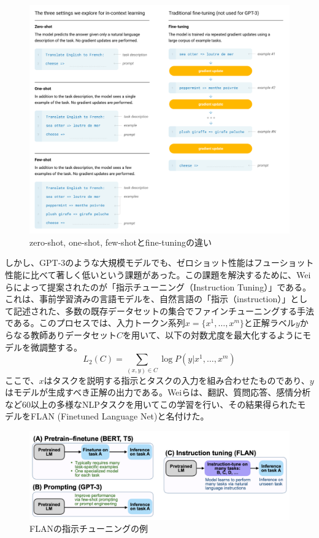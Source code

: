 \documentclass[a4paper,11pt]{jreport}
\begin{document}
\begin{figure}[t]
  \centering
  \includegraphics[width=\linewidth]{./fig/gpt3_fig2.png}
  \caption{zero-shot, one-shot, few-shotとfine-tuningの違い\cite{GPT-3}}
  \label{fig:gpt3_example}
\end{figure}

しかし、GPT-3のような大規模モデルでも、ゼロショット性能はフューショット性能に比べて著しく低いという課題があった。この課題を解決するために、Weiらによって提案されたのが「指示チューニング（Instruction Tuning）」である\cite{Instruction-Tuning}。これは、事前学習済みの言語モデルを、自然言語の「指示（instruction）」として記述された、多数の既存データセットの集合でファインチューニングする手法である。このプロセスでは、入力トークン系列$x = \{x^1, \dots, x^m\}$と正解ラベル$y$からなる教師ありデータセット$C$を用いて、以下の対数尤度を最大化するようにモデルを微調整する。
$$
L_2(C) = \sum_{(x,y) \in C} \log P(y | x^1, \dots, x^m)
$$
ここで、$x$はタスクを説明する指示とタスクの入力を組み合わせたものであり、$y$はモデルが生成すべき正解の出力である。Weiらは、翻訳、質問応答、感情分析など60以上の多様なNLPタスクを用いてこの学習を行い、その結果得られたモデルをFLAN (Finetuned Language Net)と名付けた。

\begin{figure}[t]
  \centering
  \includegraphics[width=\linewidth]{./fig/flan_fig2.png}
  \caption{FLANの指示チューニングの例\cite{Instruction-Tuning}}
  \label{fig:flan_example}
\end{figure}
\end{document}

